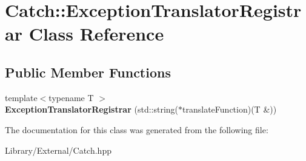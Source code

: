 \hypertarget{class_catch_1_1_exception_translator_registrar}{}\section{Catch\+:\+:Exception\+Translator\+Registrar Class Reference}
\label{class_catch_1_1_exception_translator_registrar}
\subsection*{Public Member Functions}
\begin{DoxyCompactItemize}
\item 
\hypertarget{class_catch_1_1_exception_translator_registrar_aa73229de911f26b1df6c6c87c4d9e04e}{}{\footnotesize template$<$typename T $>$ }\\{\bfseries Exception\+Translator\+Registrar} (std\+::string($\ast$translate\+Function)(T \&))\label{class_catch_1_1_exception_translator_registrar_aa73229de911f26b1df6c6c87c4d9e04e}

\end{DoxyCompactItemize}


The documentation for this class was generated from the following file\+:\begin{DoxyCompactItemize}
\item 
Library/\+External/Catch.\+hpp\end{DoxyCompactItemize}
